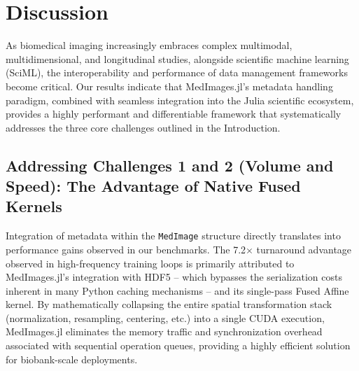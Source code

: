 \documentclass[10pt,letterpaper]{article}
\begin{document}


\section{Discussion}
As biomedical imaging increasingly embraces complex multimodal, multidimensional, and longitudinal studies, alongside scientific machine learning (SciML), the interoperability and performance of data management frameworks become critical. Our results indicate that MedImages.jl’s metadata handling paradigm, combined with seamless integration into the Julia scientific ecosystem, provides a highly performant and differentiable framework that systematically addresses the three core challenges outlined in the Introduction.  

\subsection*{Addressing Challenges 1 and 2 (Volume and Speed): The Advantage of Native Fused Kernels}
Integration of metadata within the \texttt{MedImage} structure directly translates into performance gains observed in our benchmarks. The 7.2$\times$ turnaround advantage observed in high-frequency training loops is primarily attributed to MedImages.jl's integration with HDF5 -- which bypasses the serialization costs inherent in many Python caching mechanisms -- and its single-pass Fused Affine kernel. By mathematically collapsing the entire spatial transformation stack (normalization, resampling, centering, etc.) into a single CUDA execution, MedImages.jl eliminates the memory traffic and synchronization overhead associated with sequential operation queues, providing a highly efficient solution for biobank-scale deployments.
\end{document}
